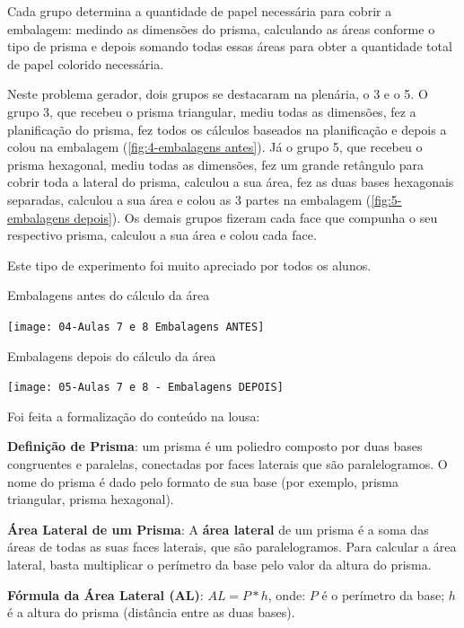 Cada grupo determina a quantidade de papel necessária para cobrir a embalagem: medindo as dimensões do prisma, calculando as áreas conforme o tipo de prisma e depois somando todas essas áreas para obter a quantidade total de papel colorido necessária.

Neste problema gerador, dois grupos se destacaram na plenária, o 3 e o 5. O grupo 3, que recebeu o prisma triangular, mediu todas as dimensões, fez a planificação do prisma, fez todos os cálculos baseados na planificação e depois a colou na embalagem (\autoref{fig:4-embalagens antes}). Já o grupo 5, que recebeu o prisma hexagonal, mediu todas as dimensões, fez um grande retângulo para cobrir toda a lateral do prisma, calculou a sua área, fez as duas bases hexagonais separadas,  calculou a sua área e colou as 3 partes na embalagem (\autoref{fig:5-embalagens depois}). Os demais grupos fizeram cada face que compunha o seu respectivo prisma, calculou a sua área e colou cada face.

Este tipo de experimento foi muito apreciado por todos os alunos.

\begin{CenteredFigure}
    \caption{Embalagens antes do cálculo da área} \label{fig:4-embalagens antes}
    \texttt{[image: 04-Aulas 7 e 8 Embalagens ANTES]}
    \legend{\autoria}
\end{CenteredFigure}

\begin{CenteredFigure}
    \caption{Embalagens depois do cálculo da área} \label{fig:5-embalagens depois}
    \texttt{[image: 05-Aulas 7 e 8 - Embalagens DEPOIS]}
    \legend{\autoria}
\end{CenteredFigure}

Foi feita a formalização do conteúdo na lousa:

\textbf{Definição de Prisma}: um prisma é um poliedro composto por duas bases congruentes e paralelas, conectadas por faces laterais que são paralelogramos. O nome do prisma é dado pelo formato de sua base (por exemplo, prisma triangular, prisma hexagonal).

\textbf{Área Lateral de um Prisma}: A \textbf{área lateral} de um prisma é a soma das áreas de todas as suas faces laterais, que são paralelogramos. Para calcular a área lateral, basta multiplicar o perímetro da base pelo valor da altura do prisma.

\textbf{Fórmula da Área Lateral (AL)}: \textcolor[HTML]{0000FF}{$AL = P * h$}, onde: $P$ é o perímetro da base; $h$ é a altura do prisma (distância entre as duas bases).

